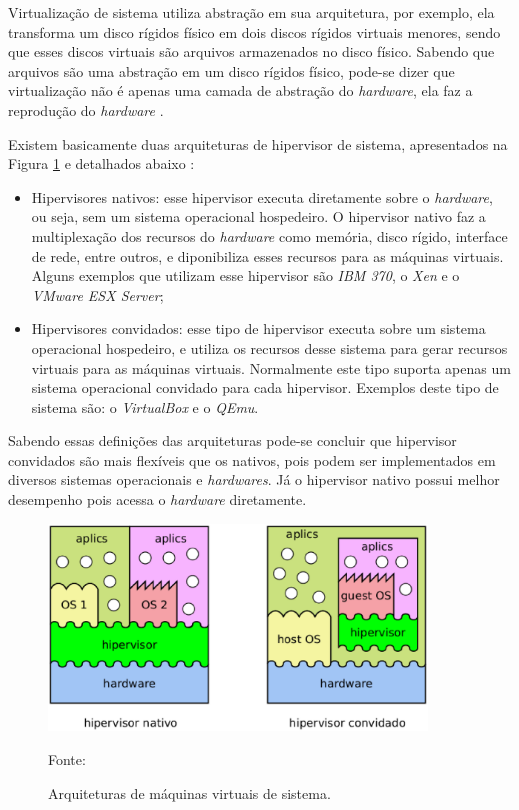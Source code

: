 Virtualização de sistema utiliza abstração em sua arquitetura, por exemplo, ela transforma um disco rígidos físico em dois discos rígidos
virtuais menores, sendo que esses discos virtuais são arquivos armazenados no disco físico. Sabendo que arquivos são uma abstração
em um disco rígidos físico, pode-se dizer que virtualização não é apenas uma camada de abstração do \textit{hardware}, ela faz a reprodução 
do \textit{hardware} \cite{smithenair2005}.

Existem basicamente duas arquiteturas de hipervisor de sistema, apresentados na Figura \ref{fig:vms_arquiteturas} e detalhados
abaixo \cite{maziero2013}:
\begin{itemize}
 \item Hipervisores nativos: esse hipervisor executa diretamente sobre o \textit{hardware}, ou seja, sem um sistema operacional
 hospedeiro. O hipervisor nativo faz a multiplexação dos recursos do \textit{hardware} como memória, disco rígido, interface de rede, 
 entre outros, e diponibiliza esses recursos para as máquinas virtuais. Alguns exemplos que utilizam esse hipervisor são 
 \textit{IBM 370}, o \textit{Xen} e o \textit{VMware ESX Server};
 \item Hipervisores convidados: esse tipo de hipervisor executa sobre um sistema operacional hospedeiro, e utiliza os recursos 
 desse sistema para gerar recursos virtuais para as máquinas virtuais. Normalmente este tipo suporta apenas um sistema 
 operacional convidado para cada hipervisor. Exemplos deste tipo de sistema são: o \textit{VirtualBox} e o \textit{QEmu}.
\end{itemize}

Sabendo essas definições das arquiteturas pode-se concluir que hipervisor convidados são mais flexíveis que os nativos, pois podem ser 
implementados em diversos sistemas operacionais e \textit{hardwares}. Já o hipervisor nativo possui melhor desempenho pois acessa o 
\textit{hardware} diretamente.

\begin{figure}[vms_arquiteturas]
 \centering
 \includegraphics[width=380px]{img/vms_arquiteturas.eps}
 \caption{Arquiteturas de máquinas virtuais de sistema.}
 \label{fig:vms_arquiteturas}
 Fonte: \citet{maziero2013}
\end{figure}

